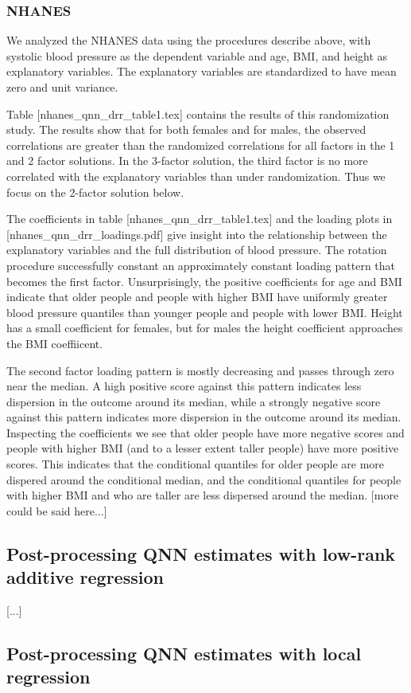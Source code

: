 \subsubsection{NHANES}

We analyzed the NHANES data using the procedures describe above, with
systolic blood pressure as the dependent variable and age, BMI, and
height as explanatory variables.  The explanatory variables are
standardized to have mean zero and unit variance.

Table [nhanes_qnn_drr_table1.tex] contains the results of this
randomization study.  The results show that for both females and for
males, the observed correlations are greater than the randomized
correlations for all factors in the 1 and 2 factor solutions.  In the
3-factor solution, the third factor is no more correlated with the
explanatory variables than under randomization.  Thus we focus on the
2-factor solution below.

The coefficients in table [nhanes_qnn_drr_table1.tex] and the loading
plots in [nhanes_qnn_drr_loadings.pdf] give insight into the
relationship between the explanatory variables and the full
distribution of blood pressure. The rotation procedure successfully
constant an approximately constant loading pattern that becomes the
first factor.  Unsurprisingly, the positive coefficients for age and
BMI indicate that older people and people with higher BMI have
uniformly greater blood pressure quantiles than younger people and
people with lower BMI. Height has a small coefficient for females, but
for males the height coefficient approaches the BMI coeffiicent.

The second factor loading pattern is mostly decreasing and passes
through zero near the median.  A high positive score against this
pattern indicates less dispersion in the outcome around its median,
while a strongly negative score against this pattern indicates more
dispersion in the outcome around its median.  Inspecting the
coefficients we see that older people have more negative scores and
people with higher BMI (and to a lesser extent taller people) have
more positive scores.  This indicates that the conditional quantiles
for older people are more dispered around the conditional median, and
the conditional quantiles for people with higher BMI and who are
taller are less dispersed around the median.  [more could be said
here...]

\subsection{Post-processing QNN estimates with low-rank additive regression}

[...]

\subsection{Post-processing QNN estimates with local regression}

